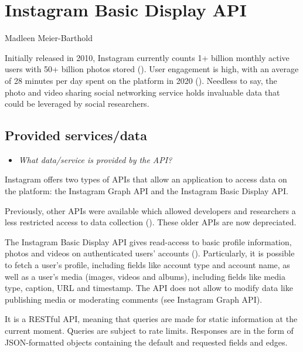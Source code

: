 \documentclass[
]{book}
\providecommand{\tightlist}{%
  \setlength{\itemsep}{0pt}\setlength{\parskip}{0pt}}
\begin{document}
\hypertarget{instagram-basic-display-api}{%
\chapter{Instagram Basic Display API}\label{instagram-basic-display-api}}

Madleen Meier-Barthold

Initially released in 2010, Instagram currently counts 1+ billion monthly active users with 50+ billion photos stored (\citet{Tankovska_undated-ph}). User engagement is high, with an average of 28 minutes per day spent on the platform in 2020 (\citet{Aslam2021-fp}). Needless to say, the photo and video sharing social networking service holds invaluable data that could be leveraged by social researchers.

\hypertarget{provided-servicesdata-6}{%
\section{Provided services/data}\label{provided-servicesdata-6}}

\begin{itemize}
\tightlist
\item
  \emph{What data/service is provided by the API?}
\end{itemize}

Instagram offers two types of APIs that allow an application to access data on the platform: the Instagram Graph API and the Instagram Basic Display API.

Previously, other APIs were available which allowed developers and researchers a less restricted access to data collection (\citet{Instagram2021-ii}). These older APIs are now depreciated.

The Instagram Basic Display API gives read-access to basic profile information, photos and videos on authenticated users' accounts (\citet{Facebook_for_Developers2021-mn}). Particularly, it is possible to fetch a user's profile, including fields like account type and account name, as well as a user's media (images, videos and albums), including fields like media type, caption, URL and timestamp. The API does not allow to modify data like publishing media or moderating comments (see Instagram Graph API).

It is a RESTful API, meaning that queries are made for static information at the current moment. Queries are subject to rate limits. Responses are in the form of JSON-formatted objects containing the default and requested fields and edges.
\end{document}
